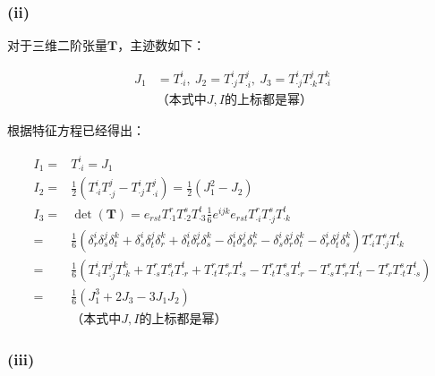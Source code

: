 \documentclass[UTF8,zihao=5]{ctexart}
\newcommand{\bm}[1]{{\mathbf{#1}}}
\begin{document}
\subsubsection*{(ii)}
对于三维二阶张量$\bm{T}$，主迹数如下：

\begin{equation}
    \begin{aligned}
        J_1&=T^i_{\cdot i},\ 
        J_2=T^i_{\cdot j}T^j_{\cdot i},\ 
        J_3=T^i_{\cdot j}T^j_{\cdot k}T^k_{\cdot i}\\
        &\text{（本式中$J,I$的上标都是幂）}
    \end{aligned}
\end{equation}

根据特征方程已经得出：

\begin{equation}
    \begin{aligned}
        I_1=&T^i_{\cdot i}=J_1\\
        I_2=&\frac{1}{2}\left(T^i_{\cdot i}T^j_{\cdot j}
        -T^i_{\cdot j}T^j_{\cdot i}\right)
        =\frac{1}{2}(J_1^2-J_2)\\
        I_3=&\det(\bm{T})=e_{rst}T^r_{\cdot 1}T^s_{\cdot 2}T^t_{\cdot 3}
        \frac{1}{6}e^{ijk}e_{rst}T^r_{\cdot i}T^s_{\cdot j}T^t_{\cdot k}\\
        =&
        \frac{1}{6}
        \left(\delta^i_r\delta^j_s\delta^k_t +
        \delta^i_s\delta^j_t\delta^k_r +
        \delta^i_t\delta^j_r\delta^k_s -
        \delta^i_t\delta^j_s\delta^k_r -
        \delta^i_s\delta^j_r\delta^k_t -
        \delta^i_r\delta^j_t\delta^k_s\right)
        T^r_{\cdot i}T^s_{\cdot j}T^t_{\cdot k}\\
        =&
        \frac{1}{6}
        \left(
        T^i_{\cdot i}T^j_{\cdot j}T^k_{\cdot k}+
        T^r_{\cdot s}T^s_{\cdot t}T^t_{\cdot r}+
        T^r_{\cdot t}T^s_{\cdot r}T^t_{\cdot s}-
        T^r_{\cdot t}T^s_{\cdot s}T^t_{\cdot r}-
        T^r_{\cdot s}T^s_{\cdot r}T^t_{\cdot t}-
        T^r_{\cdot r}T^s_{\cdot t}T^t_{\cdot s}
        \right)\\
        =&
        \frac{1}{6}
        \left(
        J_1^3+2J_3-3J_1J_2
        \right)\\
        &\text{（本式中$J,I$的上标都是幂）}
    \end{aligned}
\end{equation}

\subsubsection*{(iii)}
\end{document}
